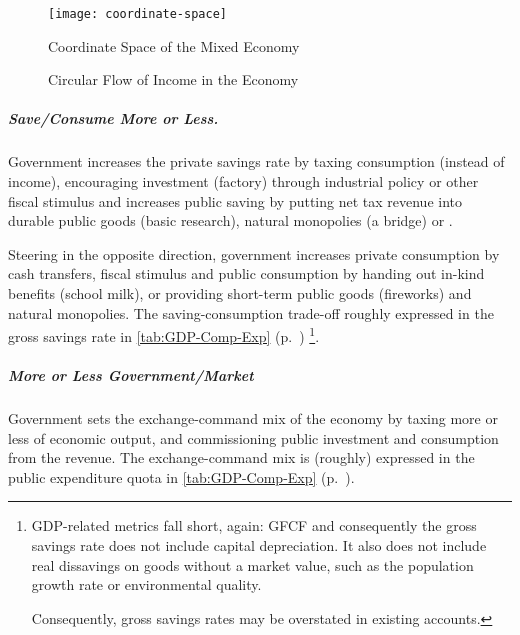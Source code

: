 \begin{landscape}
 \begin{figure}[htbp]
	\centering
	\texttt{[image: coordinate-space]}  
	\caption{Coordinate Space of the Mixed Economy}
	\label{fig:coordinate-space}
\end{figure} %
\end{landscape}

\begin{figure}[htbp]
	\centering
	\caption[Circular Flow in the Economy]{Circular Flow of Income in the Economy}
	\label{fig:circular-flow}
\end{figure} 

\subparagraph[Save More or Less]{Save/Consume More or Less.} Government increases the private savings rate by taxing consumption (instead of income), encouraging investment (factory) through industrial policy or other fiscal stimulus and increases public saving by putting net tax revenue into durable public goods (basic research), natural monopolies (a bridge) or . 

Steering in the opposite direction, government increases private consumption by cash transfers, fiscal stimulus and public consumption by handing out in-kind benefits (school milk), or providing short-term public goods (fireworks) and natural monopolies. The saving-consumption trade-off roughly expressed in the gross savings rate in \autoref{tab:GDP-Comp-Exp} (p.~\pageref{tab:GDP-Comp-Exp}) \footnote{
	GDP-related metrics fall short, again: \gls{GFCF} and consequently the gross savings rate does not include capital depreciation. It also does not include real dissavings on goods without a market value, such as the population growth rate or environmental quality. 
	
	Consequently, gross savings rates may be overstated in existing accounts.}.


\subparagraph[Exchange-Command Mix]{More or Less Government/Market} Government sets the exchange-command mix of the economy by taxing more or less of economic output, and commissioning public investment and consumption from the revenue. The exchange-command mix is (roughly) expressed in the public expenditure quota in \autoref{tab:GDP-Comp-Exp} (p.~\pageref{tab:GDP-Comp-Exp}).

